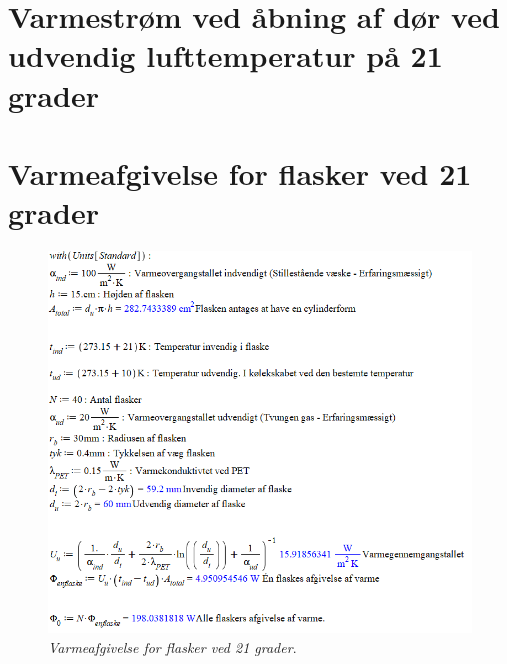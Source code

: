 \documentclass[Hovedrapport.tex]{subfiles}
\begin{document}
\section{Varmestrøm ved åbning af dør ved udvendig lufttemperatur på 21 grader}
    \label{sec:doeraabning_21C}
\begin{minipage}{1.0\textwidth}

\end{minipage}
\newpage
\section{Varmeafgivelse for flasker ved 21 grader}
    \label{sec:varmeafgivelse_ved_21grader}

\begin{figure}[H]
	\centering
	\includegraphics[width=1.0\textwidth]{Billeder/varme_ved_21grader.PNG}
	\caption{\textit{Varmeafgivelse for flasker ved 21 grader}.}
\end{figure}
\newpage
\end{document}
